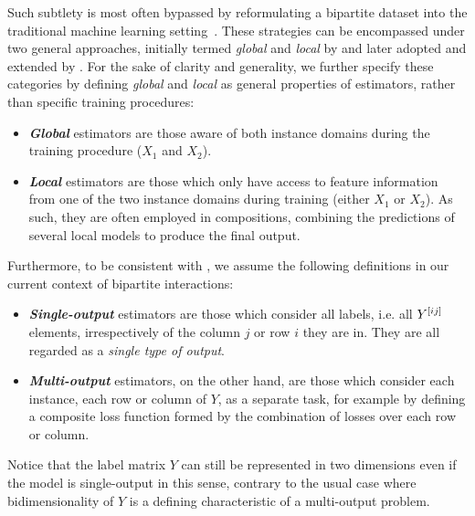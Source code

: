 Such subtlety is most often bypassed by reformulating a bipartite dataset into the traditional machine learning setting~\cite{vert2008reconstruction}.
%
These strategies can be encompassed under two general approaches, initially termed \emph{global} and \emph{local} by \textcite{vert2008reconstruction} and later adopted and extended by \textcite{sschrynemackers2015}.  %
For the sake of clarity and generality, we further specify these categories by defining \emph{global} and \emph{local} as general properties of estimators, rather than specific training procedures:
%
\begin{itemize}
    \item \emph{\textbf{Global}} estimators are those aware of both instance domains during the training procedure ($X_1$ and $X_2$).
    \item \emph{\textbf{Local}} estimators are those which only have access to feature information from one of the two instance domains during training (either $X_1$ or $X_2$).
    As such, they are often employed in compositions, combining the predictions of several local models to produce the final output.
\end{itemize}
%
Furthermore, to be consistent with \cite{schrynemackers2015classifying,pliakos2018,pliakos2019,pliakos2020}, we assume the following definitions in our current context of bipartite interactions:
%
\begin{itemize}
    \item \emph{\textbf{Single-output}} estimators are those which consider all labels, i.e. all $Y^{[ij]}$ elements, irrespectively of the column $j$ or row $i$ they are in. They are all regarded as a \emph{single type of output}.
    \item \emph{\textbf{Multi-output}} estimators, on the other hand, are those which consider each instance, each row or column of $Y$, as a separate task, for example by defining a composite loss function formed by the combination of losses over each row or column.
\end{itemize}
Notice that the label matrix $Y$ can still be represented in two dimensions even if the model is single-output in this sense, contrary to the usual case where bidimensionality of $Y$ is a defining characteristic of a multi-output problem.

